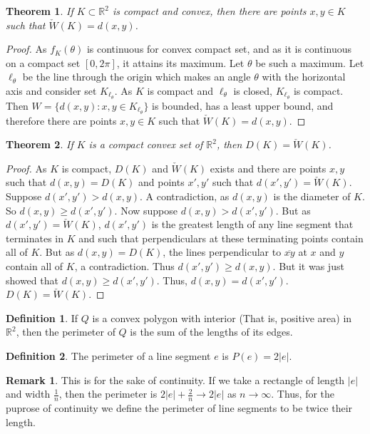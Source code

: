 \documentclass[oneside]{book}
\newtheorem{theorem}{Theorem}[section]
\theoremstyle{definition}
\newtheorem{definition}{Definition}[section]
\newtheorem{remark}{Remark}[section]
\begin{document}
\begin{theorem}
If $K\subset \mathbb{R}^2$ is compact and convex, then there are points $x,y\in K$ such that $\check{W}(K)=d(x,y)$.
\end{theorem}
\begin{proof}
As $f_K(\theta)$ is continuous for convex compact set, and as it is continuous on a compact set $[0,2\pi]$, it attains its maximum. Let $\theta$ be such a maximum. Let $\ell_{\theta}$ be the line through the origin which makes an angle $\theta$ with the horizontal axis and consider set $K_{\ell_{\theta}}$. As $K$ is compact and $\ell_{\theta}$ is closed, $K_{\ell_{\theta}}$ is compact. Then $W=\{d(x,y):x,y\in K_{\ell_{\theta}}\}$ is bounded, has a least upper bound, and therefore there are points $x,y \in K$ such that $\check{W}(K)=d(x,y)$.
\end{proof}

\begin{theorem}
If $K$ is a compact convex set of $\mathbb{R}^2$, then $D(K) = \check{W}(K)$.
\end{theorem}
\begin{proof}
As $K$ is compact, $D(K)$ and $\check{W}(K)$ exists and there are points $x,y$ such that $d(x,y) = D(K)$ and points $x',y'$ such that $d(x',y') = \check{W}(K)$. Suppose $d(x',y')> d(x,y)$. A contradiction, as $d(x,y)$ is the diameter of $K$. So $d(x,y) \geq d(x',y')$. Now suppose $d(x,y)>d(x',y')$. But as $d(x',y')= \check{W}(K)$, $d(x',y')$ is the greatest length of any line segment that terminates in $K$ and such that perpendiculars at these terminating points contain all of $K$. But as $d(x,y)=D(K)$, the lines perpendicular to $\overline{xy}$ at $x$ and $y$ contain all of $K$, a contradiction. Thus $d(x',y') \geq d(x,y)$. But it was just showed that $d(x,y)\geq d(x',y')$. Thus, $d(x,y) = d(x',y')$. $D(K) = \check{W}(K)$.
\end{proof}

\begin{definition}
If $Q$ is a convex polygon with interior (That is, positive area) in $\mathbb{R}^2$, then the perimeter of $Q$ is the sum of the lengths of its edges. 
\end{definition}

\begin{definition}
The perimeter of a line segment $e$ is $P(e) = 2|e|$.
\end{definition}

\begin{remark}
This is for the sake of continuity. If we take a rectangle of length $|e|$ and width $\frac{1}{n}$, then the perimeter is $2|e|+\frac{2}{n} \rightarrow 2|e|$ as $n\rightarrow \infty$. Thus, for the puprose of continuity we define the perimeter of line segments to be twice their length.
\end{remark}
\end{document}
